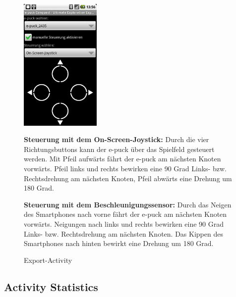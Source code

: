 \documentclass[10pt,a4paper]{article}
\begin{document}
\begin{enumerate}
			\begin{figure}[htbp]
				\begin{minipage}[t]{6.5cm}
					\vspace{10pt}
					\includegraphics[height=6.5cm]{images/steer.png} 
					\caption{Export-Activity}
				\end{minipage}
				\hfill
				\begin{minipage}[t]{0.5\textwidth}
					\vspace{10pt}
					\item \textbf{Steuerung mit dem On-Screen-Joystick:} Durch die vier Richtungsbuttons kann der e-puck über das Spielfeld gesteuert werden.
 					Mit Pfeil aufwärts fährt der e-puck am nächsten Knoten vorwärts. Pfeil links und rechts bewirken eine 90 Grad Links- bzw. Rechtsdrehung
 					am nächsten Knoten, Pfeil abwärts eine Drehung um 180 Grad.
 					\item \textbf{Steuerung mit dem Beschleunigungssensor:}
 					Durch das Neigen des Smartphones nach vorne fährt der e-puck am nächsten Knoten vorwärts. Neigungen nach links und rechts bewirken eine
 					90 Grad Links- bzw. Rechtsdrehung am nächsten Knoten. Das Kippen des Smartphones nach hinten bewirkt eine Drehung um 180 Grad.
				\end{minipage}
   			\end{figure} 	 			
 			
 			
 		\end{enumerate}
 		\newpage
	\subsection{Activity Statistics}
\end{document}
